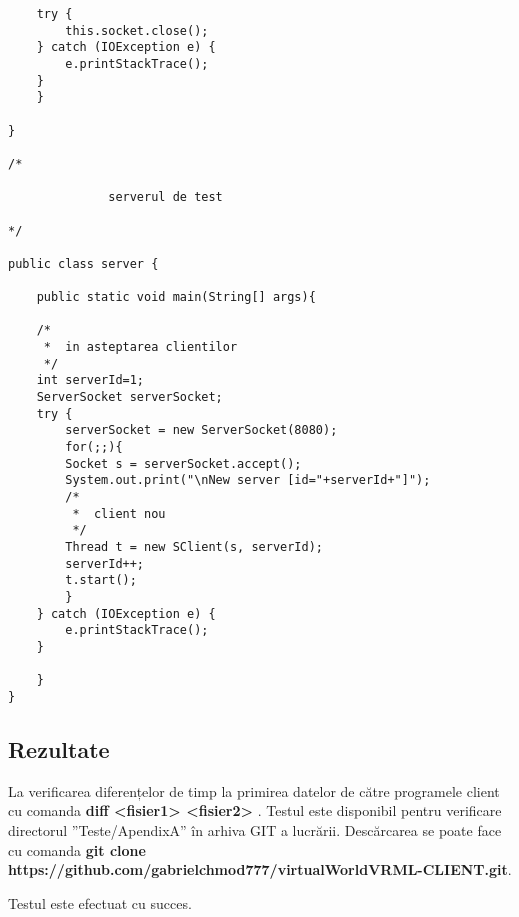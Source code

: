 \begin{lstlisting}
	try {
	    this.socket.close();
	} catch (IOException e) {
	    e.printStackTrace();
	}
    }

}

/*

              serverul de test

*/

public class server {
	
    public static void main(String[] args){
		
	/*
	 *  in asteptarea clientilor
	 */
	int serverId=1;
	ServerSocket serverSocket;
	try {
	    serverSocket = new ServerSocket(8080);
	    for(;;){
		Socket s = serverSocket.accept();
		System.out.print("\nNew server [id="+serverId+"]");
		/*
		 *  client nou
		 */
		Thread t = new SClient(s, serverId);
		serverId++;
		t.start();
	    }
	} catch (IOException e) {
	    e.printStackTrace();
	}

    }
}

\end{lstlisting}


\subsection{Rezultate}
\par La verificarea diferențelor de timp la primirea datelor de către programele client cu comanda \textbf{ diff <fisier1> <fisier2> }. Testul este disponibil pentru verificare directorul ”Teste/ApendixA” în arhiva GIT a lucrării. Descărcarea se poate face cu comanda \textbf{git clone  https://github.com/gabrielchmod777/virtualWorldVRML-CLIENT.git}.

\par Testul este efectuat cu succes.



